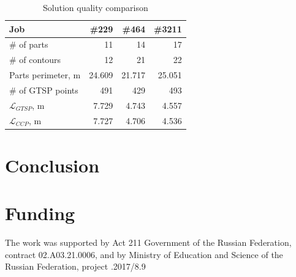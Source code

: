 \documentclass[]{interact}
\theoremstyle{plain}%
\theoremstyle{definition}
\theoremstyle{remark}
\begin{document}
\begin{table}[h]
  \begin{center}
  \begin{tabular}{l|*{3}{r}}
      Job & \#229 & \#464 & \#3211 \\
      \hline
      \# of parts & 11 & 14 & 17\\
      \# of contours & 12 & 21 & 22 \\
      Parts perimeter, m & 24.609 & 21.717 & 25.051 \\
      \# of GTSP points & 491 & 429 & 493 \\
      $\mathcal L_{GTSP}$, m & 7.729 & 4.743 & 4.557 \\
      $\mathcal L_{CCP}$, m & 7.727 & 4.706 & 4.536 \\
  \end{tabular}
  \caption{Solution quality comparison}
  \label{ccp-vs-gtsp}
  \end{center}
\end{table}

\section{Conclusion}

\section*{Funding}

The work was supported by
Act 211 Government of the Russian Federation,
contract \textnumero 02.A03.21.0006,
and by Ministry of Education and Science
of the Russian Federation,
project .2017/8.9



\nocite{*}
\end{document}
